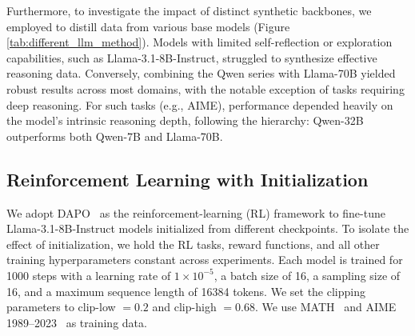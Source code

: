 \begin{table}[t]
\centering
{}
\caption{The reinforcement learning performance based on 3 initialization methods across 6 benchmarks.}
\label{tab:rl_results}
\end{table}

Furthermore, to investigate the impact of distinct synthetic backbones, we employed \method to distill data from various base models (Figure \ref{tab:different_llm_method}). Models with limited self-reflection or exploration capabilities, such as Llama-3.1-8B-Instruct, struggled to synthesize effective reasoning data. Conversely, combining the Qwen series with Llama-70B yielded robust results across most domains, with the notable exception of tasks requiring deep reasoning. For such tasks (e.g., AIME), performance depended heavily on the model's intrinsic reasoning depth, following the hierarchy: Qwen-32B outperforms both Qwen-7B and Llama-70B.

\subsection{Reinforcement Learning with \method Initialization}

We adopt DAPO~\citep{yu2025dapo} as the reinforcement-learning (RL) framework to fine-tune Llama-3.1-8B-Instruct models initialized from different checkpoints. To isolate the effect of initialization, we hold the RL tasks, reward functions, and all other training hyperparameters constant across experiments. Each model is trained for 1000 steps with a learning rate of \(1 \times 10^{-5}\), a batch size of 16, a sampling size of 16, and a maximum sequence length of 16384 tokens. We set the clipping parameters to clip-low $=0.2$ and clip-high $=0.68$. We use MATH~\citep{hendrycks2021measuring} and AIME 1989--2023~\citep{aime_1983_2024} as training data.

